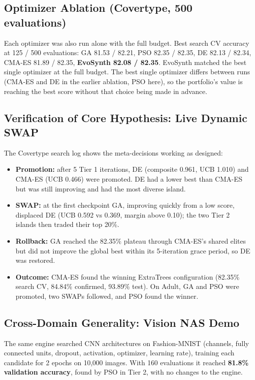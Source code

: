 \documentclass[11pt, a4paper]{article}
\begin{document}
\subsection{Optimizer Ablation (Covertype, 500 evaluations)}
\noindent
Each optimizer was also run alone with the full budget. Best search CV accuracy at 125 / 500 evaluations: GA 81.53 / 82.21, PSO 82.35 / 82.35, DE 82.13 / 82.34, CMA-ES 81.89 / 82.35, \textbf{EvoSynth 82.08 / 82.35}. EvoSynth matched the best single optimizer at the full budget. The best single optimizer differs between runs (CMA-ES and DE in the earlier ablation, PSO here), so the portfolio's value is reaching the best score without that choice being made in advance.

\subsection{Verification of Core Hypothesis: Live Dynamic SWAP}
\noindent
The Covertype search log shows the meta-decisions working as designed:
\begin{itemize}[noitemsep, topsep=2pt]
    \item \textbf{Promotion:} after 5 Tier 1 iterations, DE (composite 0.961, UCB 1.010) and CMA-ES (UCB 0.466) were promoted. DE had a lower best than CMA-ES but was still improving and had the most diverse island.
    \item \textbf{SWAP:} at the first checkpoint GA, improving quickly from a low score, displaced DE (UCB 0.592 vs 0.369, margin above 0.10); the two Tier 2 islands then traded their top 20\%.
    \item \textbf{Rollback:} GA reached the 82.35\% plateau through CMA-ES's shared elites but did not improve the global best within its 5-iteration grace period, so DE was restored.
    \item \textbf{Outcome:} CMA-ES found the winning ExtraTrees configuration (82.35\% search CV, 84.84\% confirmed, 93.89\% test). On Adult, GA and PSO were promoted, two SWAPs followed, and PSO found the winner.
\end{itemize}

\subsection{Cross-Domain Generality: Vision NAS Demo}
\noindent
The same engine searched CNN architectures on Fashion-MNIST (channels, fully connected units, dropout, activation, optimizer, learning rate), training each candidate for 2 epochs on 10,000 images. With 160 evaluations it reached \textbf{81.8\% validation accuracy}, found by PSO in Tier 2, with no changes to the engine.
\end{document}
